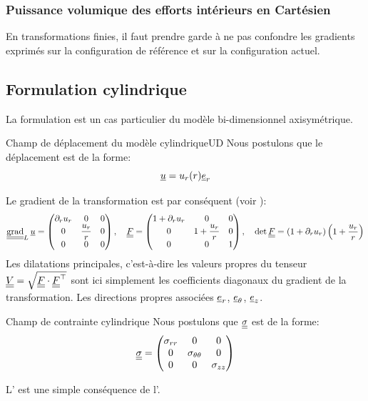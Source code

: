 \documentclass[10pt]{book}
\begin{document}
\subsubsection{Puissance volumique des efforts intérieurs en Cartésien}
En transformations finies, il faut prendre garde à ne pas confondre les gradients exprimés sur la configuration de référence et sur la configuration actuel. 
\subsection{Formulation cylindrique}\label{Subsection:CylindriqueUD}
La formulation est un cas particulier du modèle bi-dimensionnel axisymétrique.
\begin{Hypothese}{Champ de déplacement du modèle cylindriqueUD}\label{Hyp:Forme_champ_dep_cyl1D} Nous postulons que le déplacement est de la forme:
$$\underline{u}=u_{r}(r)\underline{e}_{r}$$
\end{Hypothese}
Le gradient de la transformation est par conséquent (voir ):
$$\tgrad_{L}\Dep=\begin{pmatrix}
\partial_{r}u_{r} & 0 & 0\\
0 & \dfrac{u_{r}}{r} & 0\\
0 & 0 & 0
\end{pmatrix}, \quad \GT = \begin{pmatrix}
1+\partial_{r}u_{r} & 0 & 0\\
0 & 1+\dfrac{u_{r}}{r} & 0\\
0 & 0 & 1
\end{pmatrix}, \quad \det\GT=\left(1+\partial_{r}u_{r} \right)\left(1+\dfrac{u_{r}}{r}\right)$$
Les dilatations principales, c'est-à-dire les valeurs propres du tenseur $\underline{\underline{V}}=\sqrt{\underline{\underline{F}}\cdot\underline{\underline{F}}^{\top}}$ sont ici simplement les coefficients diagonaux du gradient de la transformation. Les directions propres associées $\underline{e}_{r}$, $\underline{e}_{\theta}$, $\underline{e}_{z}$.
\begin{Hypothese}{Champ de contrainte cylindrique}\label{Hyp:Forme_champ_contraintes_cyl1D} Nous postulons que $\underline{\underline{\sigma}}$ est de la forme:
$$\underline{\underline{\sigma}} = \begin{pmatrix}
\sigma_{rr} & 0 & 0\\
0 & \sigma_{\theta\theta} & 0\\
0 & 0 & \sigma_{zz}
\end{pmatrix}$$
\end{Hypothese}
L' est une simple conséquence de l'.\\
\end{document}
